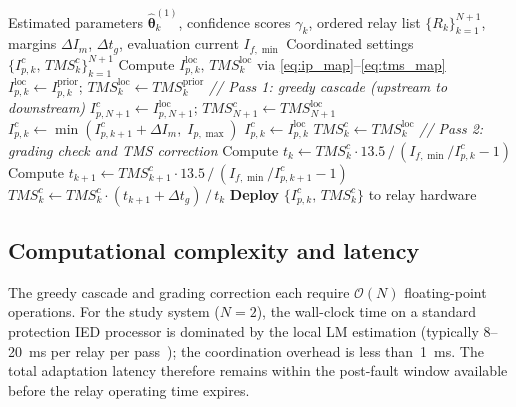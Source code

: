 \documentclass[journal,twoside,letterpaper]{IEEEtran}
\newcommand{\vect}[1]{\bm{#1}}
\newcommand{\est}[1]{\hat{#1}}
\begin{document}
\begin{algorithm}[!t]
\caption{Supervisory coordination enforcement}
\label{alg:coord}
\begin{algorithmic}[1]
\Require Estimated parameters $\est{\vect\theta}_k^{(1)}$,
         confidence scores $\gamma_k$,
         ordered relay list $\{R_k\}_{k=1}^{N+1}$,
         margins $\Delta I_m$, $\Delta t_g$,
         evaluation current $I_{f,\min}$
\Ensure  Coordinated settings $\{I_{p,k}^c,\,TMS_k^c\}_{k=1}^{N+1}$
\Statex
{}
    \State Compute $I_{p,k}^{\mathrm{loc}},\,TMS_k^{\mathrm{loc}}$
           via \eqref{eq:ip_map}--\eqref{eq:tms_map}
  \Else
    \State $I_{p,k}^{\mathrm{loc}} \leftarrow I_{p,k}^{\mathrm{prior}}$;\;
           $TMS_k^{\mathrm{loc}} \leftarrow TMS_k^{\mathrm{prior}}$
  \EndIf
\EndFor
\Statex
\State \textit{// Pass 1: greedy cascade (upstream to downstream)}
\State $I_{p,N+1}^c \leftarrow I_{p,N+1}^{\mathrm{loc}}$;\;
       $TMS_{N+1}^c \leftarrow TMS_{N+1}^{\mathrm{loc}}$
    \State $I_{p,k}^c \leftarrow \min(I_{p,k+1}^c + \Delta I_m,\; I_{p,\max})$
  \Else
    \State $I_{p,k}^c \leftarrow I_{p,k}^{\mathrm{loc}}$
  \EndIf
  \State $TMS_k^c \leftarrow TMS_k^{\mathrm{loc}}$ 
\EndFor
\Statex
\State \textit{// Pass 2: grading check and TMS correction}
  \State Compute $t_k \leftarrow TMS_k^c \cdot 13.5\,/\,(I_{f,\min}/I_{p,k}^c - 1)$
  \State Compute $t_{k+1} \leftarrow TMS_{k+1}^c \cdot 13.5\,/\,(I_{f,\min}/I_{p,k+1}^c - 1)$
    \State $TMS_k^c \leftarrow TMS_k^c \cdot (t_{k+1} + \Delta t_g)\,/\,t_k$
  \EndIf
\EndFor
\Statex
\State \textbf{Deploy} $\{I_{p,k}^c,\,TMS_k^c\}$ to relay hardware
\end{algorithmic}
\end{algorithm}

\subsection{Computational complexity and latency}

The greedy cascade and grading correction each require
$\mathcal{O}(N)$ floating-point operations.
For the study system ($N=2$), the wall-clock time on a
standard protection IED processor is dominated by the
local LM estimation (typically 8--20~ms per relay per
pass~\cite{Eluvathingal2025_TR01}); the coordination
overhead is less than~1~ms.
The total adaptation latency therefore remains within the
post-fault window available before the relay operating
time expires.
\end{document}
